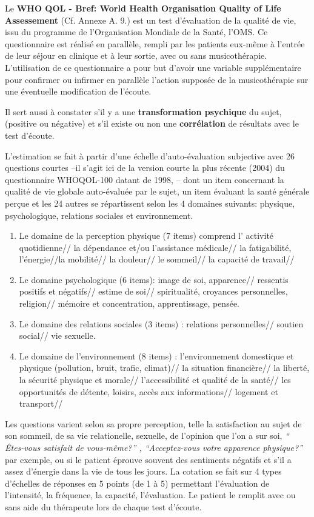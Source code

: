         Le\textbf{ WHO QOL  - Bref:  World Health
   Organisation Quality of Life Assessement } (Cf. Annexe A. 9.) est un test d'évaluation de la qualité de vie, issu du
	programme de l'Organisation Mondiale de la Santé, l'OMS.
	Ce questionnaire est réalisé en parallèle, rempli par
        les patients eux-même à l'entrée de leur séjour en clinique et
        à leur sortie, avec ou sans musicothérapie.
 L'utilisation de ce questionnaire a pour but d'avoir
 une variable supplémentaire pour confirmer ou infirmer en
parallèle l'action supposée  de la musicothérapie sur une éventuelle
modification de l'écoute.

Il sert aussi à constater s'il y a une\textbf{ transformation psychique }du sujet,
 (positive ou négative) et s'il existe ou non une \textbf{corrélation }de
 résultats avec le test d'écoute.


        L'estimation se fait à partir d'une échelle
d'auto-évaluation subjective avec 26 questions courtes
--il s'agit ici de la version courte  la plus récente (2004) du questionnaire
 WHOQOL-100 datant de 1998, --
dont un item concernant la qualité de vie globale
auto-évaluée par le sujet, un item évaluant la santé générale perçue
et les 24 autres se répartissent selon les 4 domaines suivants: physique, psychologique, relations sociales et environnement.
\begin{enumerate}
\item  Le domaine de la perception physique (7 items) comprend l' activité quotidienne// la dépendance et/ou l'assistance médicale// la fatigabilité, l'énergie//la mobilité// la douleur// le sommeil// la capacité de travail//
	\item Le domaine psychologique (6 items):  image de soi, apparence// ressentis positifs et négatifs// estime de soi// spiritualité, croyances personnelles, religion// mémoire et concentration, apprentissage, pensée.
		\item Le domaine des relations sociales (3 items) : relations personnelles// soutien social// vie sexuelle.
			\item Le domaine de l'environnement (8 items) :
                         l'environnement domestique et physique
                         (pollution, bruit, trafic, climat)// la
                         situation financière//  la liberté, la
                         sécurité physique et morale//
                         l'accessibilité et qualité de la santé// les
                         opportunités de détente, loisirs, accès aux
                         informations// logement et transport//
\end{enumerate}
		Les questions varient selon sa propre perception, telle la satisfaction
au sujet de son  sommeil, de sa vie relationelle, sexuelle, de
l'opinion que l'on a sur soi, \textit{`` Êtes-vous satisfait de
vous-même?'' , ``Acceptez-vous votre apparence physique?''} par
exemple, ou si le patient éprouve souvent des sentiments négatifs
et s'il a assez d'énergie dans la vie de tous les jours.
La cotation se fait sur 4 types d'échelles de réponses en 5 points (de 1 à 5)
permettant l'évaluation de l'intensité, la fréquence, la capacité, l'évaluation.
Le patient le remplit avec ou sans aide du
thérapeute lors de chaque test
d'écoute.

